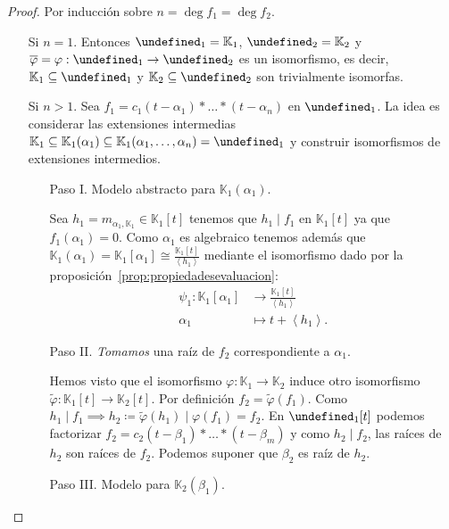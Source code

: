 \documentclass[10pt, spanish]{report}
\theoremstyle{definition}
\newcommand{\K}{\mathbb{K}}
\let\L\undefined
\newcommand{\L}{\mathbb{L}}
\begin{document}
\begin{proof}
    Por inducción sobre $n=\deg{f_1}=\deg{f_2}$.
    \begin{itemize}[itemindent=30pt]
        \item[Si $n=1$.] Entonces $\L_1=\K_1$, $\L_2=\K_2$ y
            $\overline{\varphi}=\varphi:\L_1\to\L_2$ es un isomorfismo, es
            decir, $\K_1\subseteq\L_1$ y $\K_2\subseteq\L_2$ son trivialmente
            isomorfas.
        \item[Si $n>1$.] Sea $f_1=c_1(t-\alpha_1)*\ldots*(t-\alpha_n)$ en
            $\L_1$. La idea es considerar las extensiones intermedias
            $\K_1\subseteq\K_1(\alpha_1)\subseteq\K_1(\alpha_1,\ldots,\alpha_n)=\L_1$
            y construir isomorfismos de extensiones intermedios.
            \begin{enumerate}[itemindent=24pt]
                \item[Paso I.] Modelo abstracto para $\K_1(\alpha_1)$.

                    Sea $h_1=m_{\alpha_1,\K_1}\in\K_1[t]$ tenemos que
                    $h_1\mid f_1$ en $\K_1[t]$ ya que $f_1(\alpha_1)=0$.
                    Como $\alpha_1$ es algebraico tenemos además que
                    $\K_1(\alpha_1)=\K_1[\alpha_1]\cong
                    \frac{\K_1[t]}{\left<h_1\right>}$ mediante el isomorfismo
                    dado por la proposición~\ref{prop:propiedadesevaluacion}:
                    \begin{align*}
                        \psi_1: \K_1[\alpha_1]&\to \frac{\K_1[t]}{\left< h_1
                        \right>}\\
                            \alpha_1&\mapsto t+\left<h_1\right>.
                    \end{align*}
                \item[Paso II.] \textit{Tomamos} una raíz de $f_2$
                    correspondiente a $\alpha_1$.

                    Hemos visto que el isomorfismo $\varphi:\K_1\to \K_2$ induce
                    otro isomorfismo $\tilde{\varphi}:\K_1[t]\to\K_2[t]$. Por
                    definición $f_2=\tilde{\varphi}(f_1)$. Como $h_1\mid
                    f_1\implies
                    h_2\coloneqq\tilde{\varphi}(h_1)\mid\varphi(f_1)=f_2$. En
                    $\L_1[t]$ podemos factorizar
                    $f_2=c_2(t-\beta_1)*\ldots*(t-\beta_m)$ y como $h_2\mid
                    f_2$, las raíces de $h_2$ son raíces de $f_2$. Podemos
                    suponer que $\beta_2$ es raíz de $h_2$.
                \item[Paso III.] Modelo para $\K_2(\beta_1)$.


\end{enumerate}
\end{itemize}
\end{proof}
\end{document}
